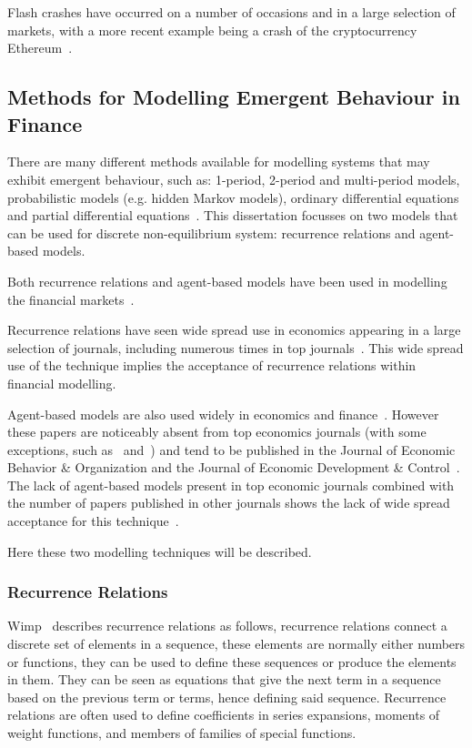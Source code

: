 \documentclass{article}
\begin{document}
Flash crashes have occurred on a number of occasions and in a large selection of markets, with a more recent example being a crash of the cryptocurrency Ethereum~\cite{cryptocrash}.


\subsection{Methods for Modelling Emergent Behaviour in Finance}  \label{litreviewofabmrr} 
There are many different methods available for modelling systems that may exhibit emergent behaviour, such as: 1-period, 2-period and multi-period models, probabilistic models (e.g. hidden Markov models), ordinary differential equations and partial differential equations~\cite{modles1, modles2, moldes3, moldes4}. This dissertation focusses on two models that can be used for discrete non-equilibrium system: recurrence relations and agent-based models. 

Both recurrence relations and agent-based models have been used in modelling the financial markets~\cite{rra10, rra1, abma2}.

Recurrence relations have seen wide spread use in economics appearing in a large selection of journals, including numerous times in top journals~\cite{rra2, rra3, rra4, rra5, rra6, rra7, rra8, rra9}. This wide spread use of the technique implies the acceptance of recurrence relations within financial modelling.      

Agent-based models are also used widely in economics and finance~\cite{abma3, abma4}. However these papers are noticeably absent from top economics journals (with some exceptions, such as~\cite{abmexp1} and~\cite{abmexp2}) and tend to be published in the Journal of Economic Behavior \& Organization and the Journal of Economic Development \& Control~\cite{whereabmp, farmerfoleynature}. The lack of agent-based models present in top economic journals combined with the number of papers published in other journals shows the lack of wide spread acceptance for this technique~\cite{agbntj, econmistsnoabm, lob_noecomimists}.

Here these two modelling techniques will be described.  


\subsubsection{Recurrence Relations} 
Wimp~\cite{recurrelationbook} describes recurrence relations as follows, recurrence relations connect a discrete set of elements in a sequence, these elements are normally either numbers or functions, they can be used to define these sequences or produce the elements in them. They can be seen as equations that give the next term in a sequence based on the previous term or terms, hence defining said sequence. Recurrence relations are often used to define coefficients in series expansions, moments of weight functions, and members of families of special functions.
\end{document}
